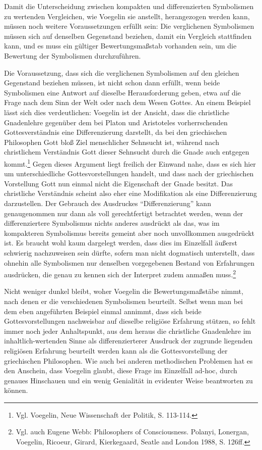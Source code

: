 Damit die Unterscheidung zwischen kompakten und differenzierten Symbolismen zu
wertenden Vergleichen, wie Voegelin sie anstellt, herangezogen werden kann,
müssen noch weitere Voraussetzungen erfüllt sein: Die verglichenen Symbolismen
müssen sich auf denselben Gegenstand beziehen, damit ein Vergleich
stattfinden kann, und es muss ein gültiger Bewertungsmaßstab vorhanden sein, um
die Bewertung der Symbolismen durchzuführen.

Die Voraussetzung, dass sich die verglichenen Symbolismen auf den gleichen
Gegenstand beziehen müssen, ist nicht schon dann erfüllt, wenn beide
Symbolismen eine Antwort auf dieselbe Herausforderung geben, etwa auf die
Frage nach dem Sinn der Welt oder nach dem Wesen Gottes. An einem Beispiel
lässt sich dies verdeutlichen: Voegelin ist der Ansicht, dass die christliche
Gnadenlehre gegenüber dem bei Platon und Aristoteles vorherrschenden
Gottesverständnis eine Differenzierung darstellt, da bei den griechischen
Philosophen Gott bloß Ziel menschlicher Sehnsucht ist, während nach
christlichem Verständnis Gott dieser Sehnsucht durch die Gnade auch entgegen
kommt.\footnote{Vgl. Voegelin, Neue Wissenschaft der Politik, S. 113-114.}
Gegen dieses Argument liegt freilich der Einwand nahe, dass es sich hier um
unterschiedliche Gottesvorstellungen handelt, und dass nach der griechischen
Vorstellung Gott nun einmal nicht die Eigenschaft der Gnade besitzt. Das
christliche Verständnis scheint also eher eine Modifikation als eine
Differenzierung darzustellen. Der Gebrauch des Ausdruckes "`Differenzierung"'
kann genaugenommen nur dann als voll gerechtfertigt betrachtet werden, wenn
der differenziertere Symbolismus nichts anderes ausdrückt als das, was im
kompakteren Symbolismus bereits gemeint aber noch unvollkommen ausgedrückt
ist. Es braucht wohl kaum dargelegt werden, dass dies im Einzelfall äußerst
schwierig nachzuweisen sein dürfte, sofern man nicht dogmatisch unterstellt,
dass ohnehin alle Symbolismen nur denselben vorgegebenen Bestand von
Erfahrungen ausdrücken, die genau zu kennen sich der Interpret zudem anmaßen
muss.\footnote{Vgl. auch Eugene Webb: Philosophers of Consciousness. Polanyi,
  Lonergan, Voegelin, Ricoeur, Girard, Kierkegaard, Seatle and London 1988,
  S. 126ff.}

Nicht weniger dunkel bleibt, woher Voegelin die Bewertungsmaßstäbe nimmt, nach
denen er die verschiedenen Symbolismen beurteilt. Selbst wenn man bei dem eben
angeführten Beispiel einmal annimmt, dass sich beide Gottesvorstellungen
nachweisbar auf dieselbe religiöse Erfahrung stützen, so fehlt immer noch
jeder Anhaltspunkt, aus dem heraus die christliche Gnadenlehre im
inhaltlich-wertenden Sinne als differenzierterer Ausdruck der zugrunde
liegenden religiösen Erfahrung beurteilt werden kann als die Gottesvorstellung
der griechischen Philosophen. Wie auch bei anderen methodischen Problemen hat
es den Anschein, dass Voegelin glaubt, diese Frage im Einzelfall ad-hoc, durch
genaues Hinschauen und ein wenig Genialität in evidenter Weise beantworten zu
können.

